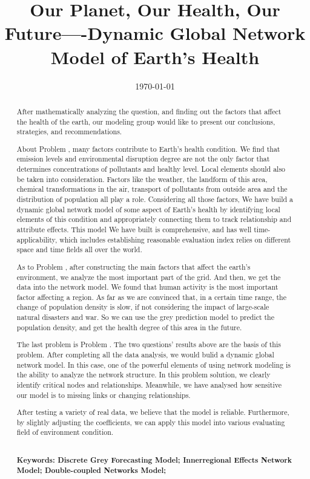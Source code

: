 \documentclass[a4paper,11pt]{article}
\title{Our Planet, Our Health, Our Future----Dynamic Global Network Model of Earth's Health}%
\date{\today}
\begin{document}
\begin{abstract}
\par After mathematically analyzing the question, and finding out the factors that affect the health of the earth, our modeling group would like to present our conclusions, strategies, and recommendations.


\par About Problem \uppercase\expandafter{}, many factors contribute to Earth's health condition. We find that emission levels and environmental disruption degree are not the only factor that determines concentrations of pollutants and healthy level. Local elements should also be taken into consideration. Factors like the weather, the landform of this area, chemical transformations in the air, transport of pollutants from outside area and the distribution of population all play a role. Considering all those factors, We have build a dynamic global network model of some aspect of Earth's health by identifying local elements of this condition and appropriately connecting them to track relationship and attribute effects. This model We have built is comprehensive, and has well time-applicability, which includes establishing reasonable evaluation index relies on different space and time fields all over the world.

\par As to Problem \uppercase\expandafter{}, after constructing the main factors that affect the earth's environment, we analyze the most important part of the grid. And then, we get the data into the network model. We found that human activity is the most important factor affecting a region. As far as we are convinced that, in a certain time range, the change of population density is slow, if not considering the impact of large-scale natural disasters and war. So we can use the grey prediction model to predict the population density, and get the health degree of this area in the future.

\par The last problem is Problem \uppercase\expandafter{}. The two questions' results above are the basis of this problem. After completing all the data analysis, we would bulid a dynamic global network model. In this case, one of the powerful elements of using network modeling is the ability to analyze the network structure. In this problem solution, we clearly identify critical nodes and relationships. Meanwhile, we have analysed how sensitive our model is to missing links or changing relationships.


\par After testing a variety of real data, we believe that the model is reliable. Furthermore, by slightly adjusting the coefficients, we can apply this model into various evaluating field of environment condition.
\textrm{\\}
\textrm{\\}

\textbf{Keywords: Discrete Grey Forecasting Model; Innerregional Effects Network Model; Double-coupled Networks Model;} 


\end{abstract}
\end{document}
